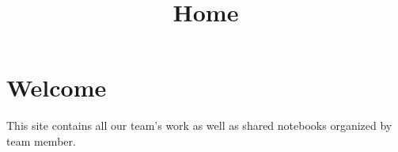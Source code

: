 \documentclass[
  letterpaper,
  DIV=11,
  numbers=noendperiod]{scrartcl}
\title{Home}
\author{}
\date{}
\begin{document}
\maketitle


\section{Welcome}\label{welcome}

This site contains all our team's work as well as shared notebooks
organized by team member.
\end{document}
